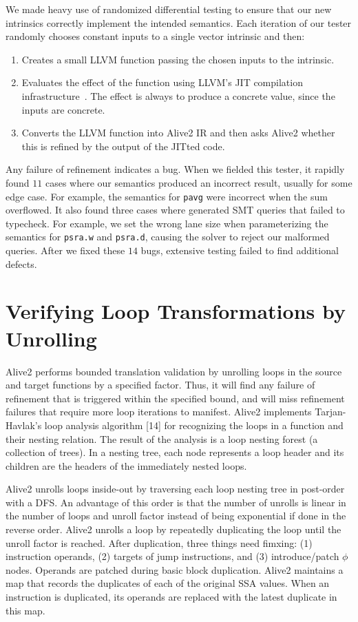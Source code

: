 We made heavy use of randomized differential testing to ensure that
our new intrinsics correctly implement the intended semantics.
%
Each iteration of our tester randomly chooses constant inputs to a
single vector intrinsic and then:
%
\begin{enumerate}
\item
  Creates a small LLVM function passing the chosen inputs to the
  intrinsic.
\item
  Evaluates the effect of the function using LLVM's JIT compilation
  infrastructure~\cite{orc}. The effect is always to produce a
  concrete value, since the inputs are concrete.
\item
  Converts the LLVM function into Alive2 IR and then asks Alive2
  whether this is refined by the output of the JITted code.
\end{enumerate}
%
Any failure of refinement indicates a bug.
%
When we fielded this tester, it rapidly found $11$ cases
where our semantics produced an incorrect result, usually for
some edge case.
%
For example, the semantics for \texttt{pavg} were incorrect when the
sum overflowed.
%
It also found three cases where \minotaur{} generated SMT queries that
failed to typecheck.
%
For example, we set the wrong lane size when parameterizing the
semantics for \texttt{psra.w} and \texttt{psra.d}, causing the solver
to reject our malformed queries.
%
After we fixed these $14$ bugs, extensive testing failed to find
additional defects.

\section {Verifying Loop Transformations by Unrolling}

Alive2 performs bounded translation validation by unrolling loops in
the source and target functions by a specified factor. Thus, it will
find any failure of refinement that is triggered within the specified
bound, and will miss refinement failures that require more loop
iterations to manifest. Alive2 implements Tarjan-Havlak’s loop
analysis algorithm [14] for recognizing the loops in a function and
their nesting relation. The result of the analysis is a loop nesting
forest (a collection of trees). In a nesting tree, each node
represents a loop header and its children are the headers of the
immediately nested loops.

Alive2 unrolls loops inside-out by traversing each loop nesting tree
in post-order with a DFS. An advantage of this order is that the
number of unrolls is linear in the number of loops and unroll factor
instead of being exponential if done in the reverse order.
%
Alive2 unrolls a loop by repeatedly duplicating the loop until the
unroll factor is reached. After duplication, three things need fimxing:
%
(1) instruction operands,
%
(2) targets of jump instructions, and
%
(3) introduce/patch $\phi$ nodes.
%
Operands are patched during basic block duplication. Alive2 maintains
a map that records the duplicates of each of the original SSA values.
When an instruction is duplicated, its operands are replaced with the
latest duplicate in this map.

